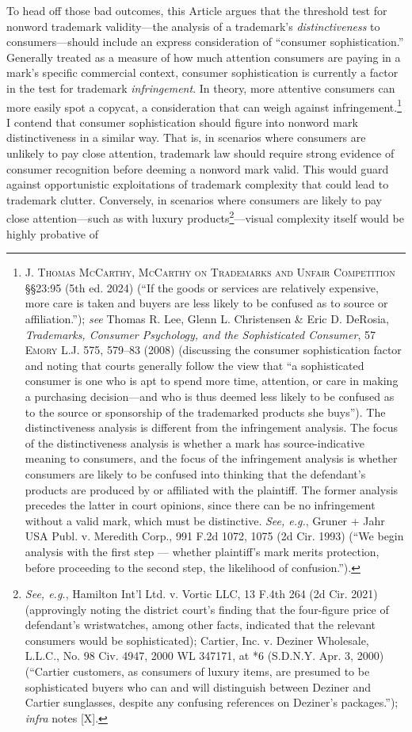 \documentclass[letterpaper, 11pt, oneside]{article}
\begin{document}
To head off those bad outcomes, this Article argues that the threshold test for nonword trademark validity—the analysis of a trademark's \textit{distinctiveness} to consumers—should include an express consideration of ``consumer sophistication.'' Generally treated as a measure of how much attention consumers are paying in a mark's specific commercial context, consumer sophistication is currently a factor in the test for trademark \textit{infringement}. In theory, more attentive consumers can more easily spot a copycat, a consideration that can weigh against infringement.\footnote{\label{supra5} \textsc{J. Thomas McCarthy, McCarthy on Trademarks and Unfair Competition} \S\S 23:95 (5th ed. 2024) (``If the goods or services are relatively expensive, more care is taken and buyers are less likely to be confused as to source or affiliation.''); \textit{see} Thomas R. Lee, Glenn L. Christensen \& Eric D. DeRosia, \textit{Trademarks, Consumer Psychology, and the Sophisticated Consumer}, 57 \textsc{Emory L.J.} 575, 579–83 (2008) (discussing the consumer sophistication factor and noting that courts generally follow the view that ``a sophisticated consumer is one who is apt to spend more time, attention, or care in making a purchasing decision—and who is thus deemed less likely to be confused as to the source or sponsorship of the trademarked products she buys''). The distinctiveness analysis is different from the infringement analysis. The focus of the distinctiveness analysis is whether a mark has source-indicative meaning to consumers, and the focus of the infringement analysis is whether consumers are likely to be confused into thinking that the defendant's products are produced by or affiliated with the plaintiff. The former analysis precedes the latter in court opinions, since there can be no infringement without a valid mark, which must be distinctive. \textit{See, e.g.}, Gruner + Jahr USA Publ. v. Meredith Corp., 991 F.2d 1072, 1075 (2d Cir. 1993) (``We begin analysis with the first step — whether plaintiff's mark merits protection, before proceeding to the second step, the likelihood of confusion.'').} I contend that consumer sophistication should figure into nonword mark distinctiveness in a similar way. That is, in scenarios where consumers are unlikely to pay close attention, trademark law should require strong evidence of consumer recognition before deeming a nonword mark valid. This would guard against opportunistic exploitations of trademark complexity that could lead to trademark clutter. Conversely, in scenarios where consumers are likely to pay close attention—such as with luxury products\footnote{\textit{See, e.g.}, Hamilton Int'l Ltd. v. Vortic LLC, 13 F.4th 264 (2d Cir. 2021) (approvingly noting the district court's finding that the four-figure price of defendant's wristwatches, among other facts, indicated that the relevant consumers would be sophisticated); Cartier, Inc. v. Deziner Wholesale, L.L.C., No. 98 Civ. 4947, 2000 WL 347171, at *6 (S.D.N.Y. Apr. 3, 2000) (``Cartier customers, as consumers of luxury items, are presumed to be sophisticated buyers who can and will distinguish between Deziner and Cartier sunglasses, despite any confusing references on Deziner's packages.''); \textit{infra} notes [X].}—visual complexity itself would be highly probative of 
\end{document}
